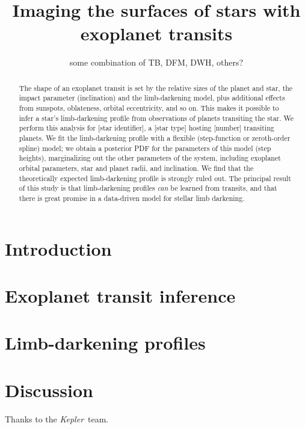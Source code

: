 \documentclass[12pt,letterpaper,preprint]{aastex}
\newcommand{\Kepler}{\textsl{Kepler}}
\begin{document}
\title{Imaging the surfaces of stars with exoplanet transits}
\author{some combination of TB, DFM, DWH, others?}

\begin{abstract}
The shape of an exoplanet transit is set by the relative sizes of the planet and
star, the impact parameter (inclination) and the limb-darkening model, plus
additional effects from sunspots, oblateness, orbital eccentricity, and so on.
%
This makes it possible to infer a star's limb-darkening profile from
observations of planets transiting the star.
%
We perform this analysis for [star identifier], a [star type] hosting [number]
transiting planets.
%
We fit the limb-darkening profile with a flexible (step-function or zeroth-order
spline) model; we obtain a posterior PDF for the parameters of this model (step
heights), marginalizing out the other parameters of the system, including
exoplanet orbital parameters, star and planet radii, and inclination.
%
We find that the theoretically expected limb-darkening profile is strongly ruled
out.
%
The principal result of this study is that limb-darkening profiles \emph{can} be
learned from transits, and that there is great promise in a data-driven model
for stellar limb darkening.
\end{abstract}


\section{Introduction}

\section{Exoplanet transit inference}

\section{Limb-darkening profiles}

\section{Discussion}

\acknowledgements
Thanks to the \Kepler\ team.
\end{document}
